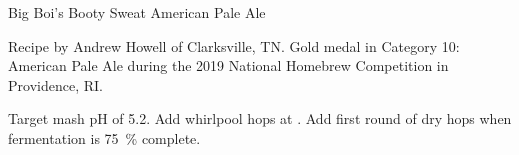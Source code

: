 \begin{recipe}{Big Boi's Booty Sweat American Pale Ale}

\begin{aboutblock}
Recipe by Andrew Howell of Clarksville, TN. Gold medal in Category 10: American
Pale Ale during the 2019 National Homebrew Competition in Providence, RI.
\sourceaha
\end{aboutblock}


\begin{methodandtiming}

\begin{mashsteps}
\end{mashsteps}

\begin{fermentationsteps}
\end{fermentationsteps}

\begin{directions}
Target mash pH of 5.2. Add whirlpool hops at . Add first round
of dry hops when fermentation is 75~\% complete.
\end{directions}

\end{methodandtiming}

\recipebreak

\begin{ingredientsblock}

\begin{malts}
\end{malts}

\begin{hops}
\end{hops}


\end{ingredientsblock}

\end{recipe}

